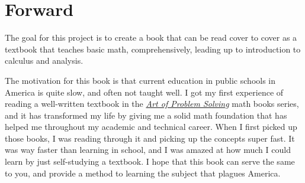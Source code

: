 \chapter*{Forward}

The goal for this project is to create a book that can be read cover to cover as a textbook that teaches basic math, comprehensively, leading up to introduction to calculus and analysis.

The motivation for this book is that current education in public schools in America is quite slow, and often not taught well.
I got my first experience of reading a well-written textbook in the \href{https://artofproblemsolving.com/}{\textit{Art of Problem Solving}}\cite{aops} math books series, and it has transformed my life by giving me a solid math foundation that has helped me throughout my academic and technical career.
When I first picked up those books, I was reading through it and picking up the concepts super fast. It was way faster than learning in school, and I was amazed at how much I could learn by just self-studying a textbook.
I hope that this book can serve the same to you, and provide a method to learning the subject that plagues America.